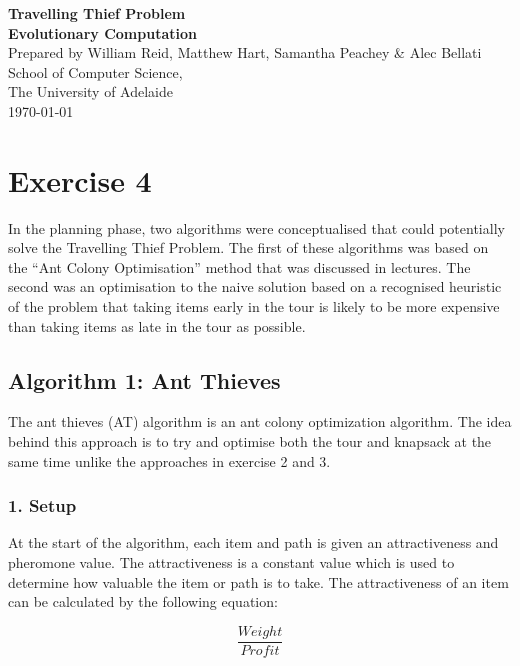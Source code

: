 \documentclass[a4paper,12pt]{article}
\begin{document}
\begin{center}
{\LARGE\bf Travelling Thief Problem}\\
\vspace{0.5cm}
{\Large\bf Evolutionary Computation}\\
\vspace{1cm}
Prepared by William Reid, Matthew Hart, Samantha Peachey \& Alec Bellati\\
\vspace{1cm}
School of Computer Science,\\
The University of Adelaide\\
\vspace{1cm}
\today
\end{center}



\section*{Exercise 4}
In the planning phase, two algorithms were conceptualised that could potentially solve the Travelling Thief Problem. The first of these algorithms was based on the ``Ant Colony Optimisation'' method that was discussed in lectures. The second was an optimisation to the naive solution based on a recognised heuristic of the problem that taking items early in the tour is likely to be more expensive than taking items as late in the tour as possible.


\subsection*{Algorithm 1: Ant Thieves}

The ant thieves (AT) algorithm is an ant colony optimization algorithm. The idea behind this approach is to try and optimise both the tour and knapsack at the same time unlike the approaches in exercise 2 and 3.


\subsubsection*{1. Setup}

At the start of the algorithm, each item and path is given an attractiveness and pheromone value. The attractiveness is a constant value which is used to determine how valuable the item or path is to take. The attractiveness of an item can be calculated by the following equation:

\begin{equation}
\frac{Weight}{Profit}
\end{equation}
\end{document}
